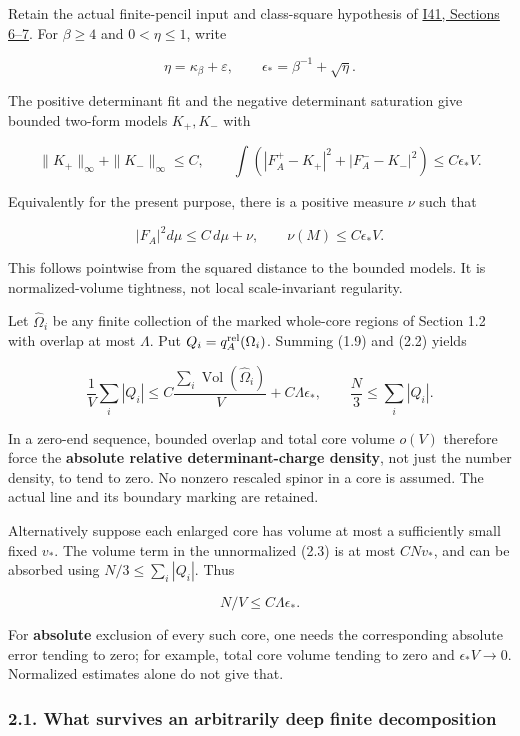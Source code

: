 \documentclass[
  10pt,
]{article}
\begin{document}
Retain the actual finite-pencil input and class-square hypothesis of
\href{20260927_conformal_separation_and_zero_end.md}{I41, Sections
6--7}. For \(\beta\ge4\) and \(0<\eta\le1\), write

\[
 \eta=\kappa_\beta+\varepsilon,\qquad
 \epsilon_*=\beta^{-1}+\sqrt\eta.
\]

The positive determinant fit and the negative determinant saturation
give bounded two-form models \(K_+,K_-\) with

\[
 \|K_+\|_\infty+\|K_-\|_\infty\le C,\qquad
 \int(|F_A^+-K_+|^2+|F_A^--K_-|^2)\le C\epsilon_*V.
 \tag{2.1}
\]

Equivalently for the present purpose, there is a positive measure
\(\nu\) such that

\[
 |F_A|^2d\mu\le C\,d\mu+\nu,\qquad
                        \nu(M)\le C\epsilon_*V.
 \tag{2.2}
\]

This follows pointwise from the squared distance to the bounded models.
It is normalized-volume tightness, not local scale-invariant regularity.

Let \(\widehat\Omega_i\) be any finite collection of the marked
whole-core regions of Section 1.2 with overlap at most \(\Lambda\). Put
\(Q_i=q_A^{\rm rel}(\Omega_i)\). Summing (1.9) and (2.2) yields

\[
 \boxed{\frac1V\sum_i|Q_i|
 \le C\frac{\sum_i\operatorname{Vol}(\widehat\Omega_i)}V
                          +C\Lambda\epsilon_*,
 \qquad \frac N3\le\sum_i|Q_i|.}
 \tag{2.3}
\]

In a zero-end sequence, bounded overlap and total core volume \(o(V)\)
therefore force the \textbf{absolute relative determinant-charge
density}, not just the number density, to tend to zero. No nonzero
rescaled spinor in a core is assumed. The actual line and its boundary
marking are retained.

Alternatively suppose each enlarged core has volume at most a
sufficiently small fixed \(v_*\). The volume term in the unnormalized
(2.3) is at most \(CNv_*\), and can be absorbed using
\(N/3\le\sum_i|Q_i|\). Thus

\[
                        N/V\le C\Lambda\epsilon_*.
 \tag{2.4}
\]

For \textbf{absolute} exclusion of every such core, one needs the
corresponding absolute error tending to zero; for example, total core
volume tending to zero and \(\epsilon_*V\to0\). Normalized estimates
alone do not give that.

\hypertarget{what-survives-an-arbitrarily-deep-finite-decomposition}{%
\subsubsection{2.1. What survives an arbitrarily deep finite
decomposition}\label{what-survives-an-arbitrarily-deep-finite-decomposition}}
\end{document}
